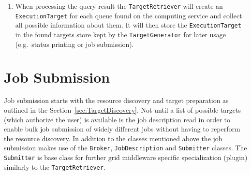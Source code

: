 \documentclass{book}
\newcommand{\Broker}{\texttt{Broker}}
\newcommand{\ExecutionTarget}{\texttt{ExecutionTarget}}
\newcommand{\JobDescription}{\texttt{JobDescription}}
\newcommand{\TargetGenerator}{\texttt{TargetGenerator}}
\newcommand{\TargetRetriever}{\texttt{TargetRetriever}}
\newcommand{\Submitter}{\texttt{Submitter}}
\begin{document}
\begin{enumerate}
{  tries to register at the service store kept by the
  {\TargetGenerator}. If allowed to register, the computing server is
  queried and the query result processed. The {\TargetGenerator} will
  not allow registrations from computing services present in its list
  of rejected computing services or from service that have already
  registered once. Computing services often register at more than one
  index server, thus different {\TargetRetriever}s may discover the
  same service.}
\item{When processing the query result the {\TargetRetriever} will
  create an {\ExecutionTarget} for each queue found on the computing
  service and collect all possible information about them. It will
  then store the {\ExecutionTarget} in the found targets store kept
  by the {\TargetGenerator} for later usage (e.g.\ status printing or
  job submission).}
\end{enumerate}

\section{Job Submission}
\label{sec:JobSubmission}

Job submission starts with the resource discovery and target
preparation as outlined in the Section~\ref{sec:TargetDiscovery}. Not
until a list of possible targets (which authorize the user) is available
is the job description read in order to enable bulk job submission of
widely different jobs without having to reperform the resource
discovery. In addition to the classes mentioned above the job
submission makes use of the {\Broker}, {\JobDescription} and
{\Submitter} classes.  The {\Submitter} is base class for further grid
middleware specific specialization (plugin) similarly to the {\TargetRetriever}.

\begin{figure}[ht]
\end{figure}
\end{document}
